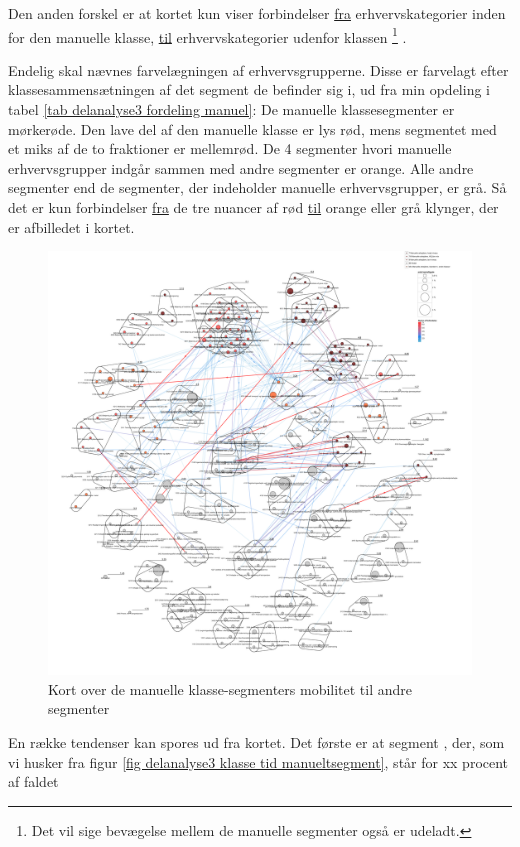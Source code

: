  Den anden forskel er at kortet kun viser forbindelser \underline{fra} erhvervskategorier inden for den manuelle klasse, \underline{til} erhvervskategorier udenfor klassen%
%
    \footnote{ Det vil sige bevægelse mellem de manuelle segmenter også er udeladt.}%
%
. 

Endelig skal nævnes farvelægningen af erhvervsgrupperne. Disse er farvelagt efter klassesammensætningen af det segment de befinder sig i, ud fra min opdeling i tabel \ref{tab delanalyse3 fordeling manuel}:
De manuelle klassesegmenter er mørkerøde. Den lave del af den manuelle klasse er lys rød, mens segmentet med et miks af de to fraktioner er mellemrød. De 4 segmenter hvori manuelle erhvervsgrupper indgår sammen med andre segmenter er orange. Alle andre segmenter end de segmenter, der indeholder manuelle erhvervsgrupper, er grå. Så det er kun forbindelser \underline{fra} de tre nuancer af rød \underline{til} orange eller grå klynger, der er afbilledet i kortet.

\begin{figure}[H]
\begin{centering}
  \includegraphics[width=10 cm]{fig/netvaerkskort/fokus_manuel_nonmanuel.pdf}
  \caption[Netværkskort: mobilitet fra den manuelle klasse]{Kort over de manuelle klasse-segmenters mobilitet til andre segmenter}
  \label{fig delanalyse3 manuelklasse fokus}
\end{centering}
\end{figure}




En række tendenser kan spores ud fra kortet. Det første er at segment , der, som vi husker fra figur \ref{fig delanalyse3 klasse tid manueltsegment}, står for xx procent af faldet 


